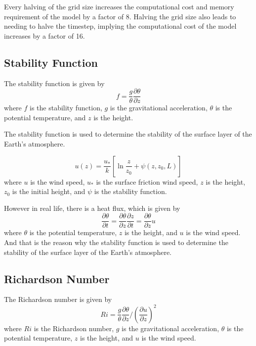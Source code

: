 \documentclass{article}
\begin{document}
Every halving of the grid size increases the computational cost and memory requirement of the model by a factor of 8. Halving the grid size also leads to needing to halve the timestep, implying the computational cost of the model increases by a factor of 16.

\subsection{Stability Function}

The stability function is given by
\begin{equation}
f = \frac{g}{\theta} \frac{\partial \theta}{\partial z}
\end{equation}
where $f$ is the stability function, $g$ is the gravitational acceleration, $\theta$ is the potential temperature, and $z$ is the height.

The stability function is used to determine the stability of the surface layer of the Earth's atmosphere. 

\begin{equation}
u(z) = \frac{u_{*}}{k} \left[\ln \frac{z}{z_{0}} + \psi(z,z_{0},L)\right]
\end{equation}
where $u$ is the wind speed, $u_{*}$ is the surface friction wind speed, $z$ is the height, $z_{0}$ is the initial height, and $\psi$ is the stability function.

However in real life, there is a heat flux, which is given by
\begin{equation}
\frac{\partial \theta}{\partial t} = \frac{\partial \theta}{\partial z} \frac{\partial z}{\partial t} = \frac{\partial \theta}{\partial z} u
\end{equation}
where $\theta$ is the potential temperature, $z$ is the height, and $u$ is the wind speed.
And that is the reason why the stability function is used to determine the stability of the surface layer of the Earth's atmosphere.

\subsection{Richardson Number}
The Richardson number is given by 
\begin{equation}
Ri = \frac{g}{\theta} \frac{\partial \theta}{\partial z} / (\frac{\partial u}{\partial z})^2
\end{equation}
where $Ri$ is the Richardson number, $g$ is the gravitational acceleration, $\theta$ is the potential temperature, $z$ is the height, and $u$ is the wind speed.
\end{document}
